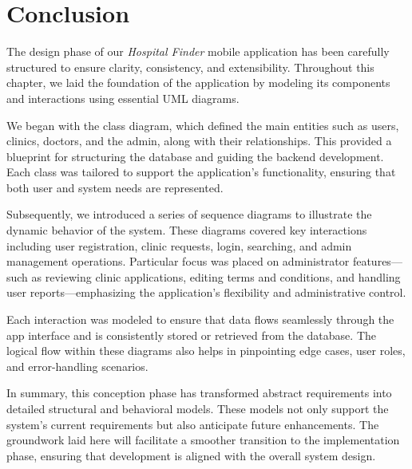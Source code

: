 \documentclass[12pt]{report}
\begin{document}
\section{Conclusion}

\vspace{1em}

\noindent
The design phase of our \textit{Hospital Finder} mobile application has been carefully structured to ensure clarity, consistency, and extensibility. Throughout this chapter, we laid the foundation of the application by modeling its components and interactions using essential UML diagrams.
\vspace{1em}

\noindent
We began with the class diagram, which defined the main entities such as users, clinics, doctors, and the admin, along with their relationships. This provided a blueprint for structuring the database and guiding the backend development. Each class was tailored to support the application's functionality, ensuring that both user and system needs are represented.

\vspace{1em}

\noindent
Subsequently, we introduced a series of sequence diagrams to illustrate the dynamic behavior of the system. These diagrams covered key interactions including user registration, clinic requests, login, searching, and admin management operations. Particular focus was placed on administrator features—such as reviewing clinic applications, editing terms and conditions, and handling user reports—emphasizing the application's flexibility and administrative control.

\vspace{1em}

\noindent
Each interaction was modeled to ensure that data flows seamlessly through the app interface and is consistently stored or retrieved from the database. The logical flow within these diagrams also helps in pinpointing edge cases, user roles, and error-handling scenarios.

\vspace{1em}

\noindent
In summary, this conception phase has transformed abstract requirements into detailed structural and behavioral models. These models not only support the system’s current requirements but also anticipate future enhancements. The groundwork laid here will facilitate a smoother transition to the implementation phase, ensuring that development is aligned with the overall system design.
\end{document}
